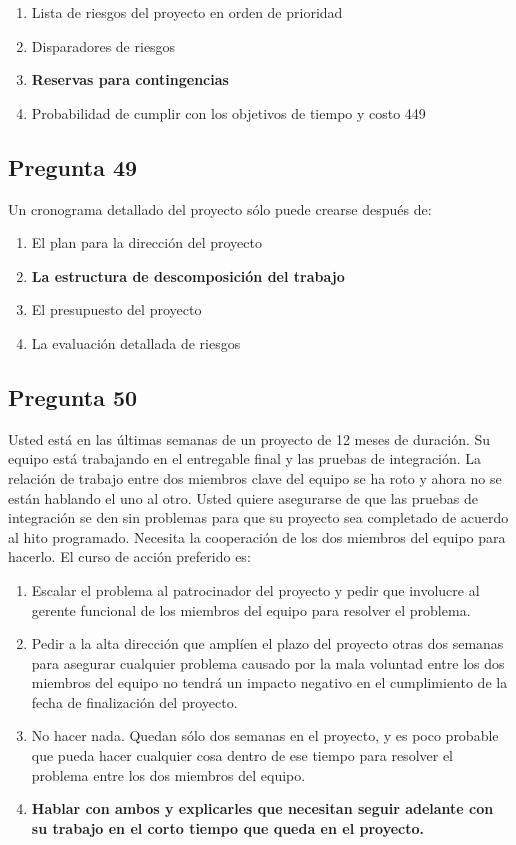 \documentclass[11pt,a4paper]{article}
\begin{document}
\begin{enumerate}[label=\alph*)]
  \item Lista de riesgos del proyecto en orden de prioridad
  \item Disparadores de riesgos
  \item \textbf{Reservas para contingencias}
  \item Probabilidad de cumplir con los objetivos de tiempo y costo 449
\end{enumerate}

\subsection*{Pregunta 49}
Un cronograma detallado del proyecto sólo puede crearse después de:

\begin{enumerate}[label=\alph*)]
  \item El plan para la dirección del proyecto
  \item \textbf{La estructura de descomposición del trabajo}
  \item El presupuesto del proyecto
  \item La evaluación detallada de riesgos
\end{enumerate}

\subsection*{Pregunta 50}
Usted está en las últimas semanas de un proyecto de 12 meses de duración. Su equipo está trabajando en el entregable final y las pruebas de integración. La relación de trabajo entre dos miembros clave del equipo se ha roto y ahora no se están hablando el uno al otro. Usted quiere asegurarse de que las pruebas de integración se den sin problemas para que su proyecto sea completado de acuerdo al hito programado. Necesita la cooperación de los dos miembros del equipo para hacerlo. El curso de acción preferido es:

\begin{enumerate}[label=\alph*)]
  \item Escalar el problema al patrocinador del proyecto y pedir que involucre al gerente funcional de los miembros del equipo para resolver el problema.
  \item Pedir a la alta dirección que amplíen el plazo del proyecto otras dos semanas para asegurar cualquier problema causado por la mala voluntad entre los dos miembros del equipo no tendrá un impacto negativo en el cumplimiento de la fecha de finalización del proyecto.
  \item No hacer nada. Quedan sólo dos semanas en el proyecto, y es poco probable que pueda hacer cualquier cosa dentro de ese tiempo para resolver el problema entre los dos miembros del equipo.
  \item \textbf{Hablar con ambos y explicarles que necesitan seguir adelante con su trabajo en el corto tiempo que queda en el proyecto.}
\end{enumerate}
\end{document}
